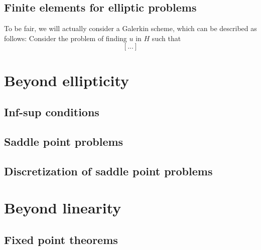\documentclass{article}
\begin{document}
\subsection{Finite elements for elliptic problems}

To be fair, we will actually consider a Galerkin scheme, which can be described as follows: Consider the problem of finding $u$ in $H$ such that
    $$ [...] $$


\section{Beyond ellipticity}\label{section:beyond-ellipticity}

\subsection{Inf-sup conditions}

\subsection{Saddle point problems}


\subsection{Discretization of saddle point problems}

\section{Beyond linearity}

\subsection{Fixed point theorems}
\end{document}
